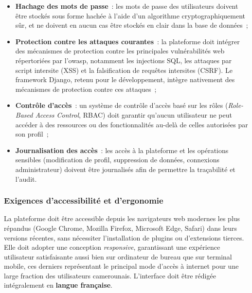 \documentclass[12pt, a4paper, oneside]{report}
\begin{document}
	\begin{itemize}
		
		\item \textbf{Hachage des mots de passe}~: les mots de passe
		des utilisateurs doivent être stockés sous forme hachée à l'aide
		d'un algorithme cryptographiquement sûr,
		et ne doivent en aucun cas être stockés en clair dans la base
		de données~;
		
		\item \textbf{Protection contre les attaques courantes}~: la
		plateforme doit intégrer des mécanismes de protection contre
		les principales vulnérabilités web répertoriées par l'\gls{owasp}, notamment les
		injections SQL, les attaques par script intersite (XSS) et
		la falsification de requêtes intersites (CSRF). Le framework
		Django, retenu pour le développement, intègre nativement des
		mécanismes de protection contre ces attaques~;
		
		\item \textbf{Contrôle d'accès}~: un système de contrôle
		d'accès basé sur les rôles (\textit{Role-Based Access Control},
		RBAC) doit garantir qu'aucun utilisateur ne peut accéder à des
		ressources ou des fonctionnalités au-delà de celles autorisées
		par son profil~;
		
		\item \textbf{Journalisation des accès}~: les accès à la
		plateforme et les opérations sensibles (modification de profil,
		suppression de données, connexions administrateur) doivent
		être journalisés afin de permettre la traçabilité et l'audit.
	\end{itemize}
	
	\subsubsection{Exigences d'accessibilité et d'ergonomie}
	
	La plateforme doit être accessible depuis les navigateurs web
	modernes les plus répandus (Google Chrome, Mozilla Firefox,
	Microsoft Edge, Safari) dans leurs versions récentes, sans
	nécessiter l'installation de plugins ou d'extensions tierces.
	Elle doit adopter une conception \textit{responsive}, garantissant
	une expérience utilisateur satisfaisante aussi bien sur ordinateur
	de bureau que sur terminal mobile, ces derniers représentant le
	principal mode d'accès à internet pour une large fraction des
	utilisateurs camerounais. L'interface doit être rédigée intégralement
	en \textbf{langue française}.
	
\end{document}

